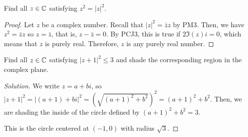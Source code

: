 \question Find all $z\in\mathbb{C}$ satisfying $z^2=|z|^2$.
\begin{proof}
  Let $z$ be a complex number.
  Recall that $|z|^2 = \bar{z}z$ by PM3.
  Then, we have $z^2 = \bar{z}z$ so $z = \bar{z}$, that is, $z - \bar{z} = 0$.
  By PCJ3, this is true if $2\Im(z)i = 0$, which means that $z$ is purely real.
  Therefore, $z$ is any purely real number.
\end{proof}


\question Find all $z\in\mathbb{C}$ satisfying $|z+1|^2 \leq 3$ and shade the corresponding region in the complex plane.
\begin{proof}[Solution]
  We write $z = a+bi$, so $|z+1|^2 = |(a+1)+bi|^2 = (\sqrt{(a+1)^2+b^2})^2 = (a+1)^2 + b^2$.
  Then, we are shading the inside of the circle defined by $(a+1)^2 + b^2 = 3$.
  \begin{center}
  \end{center}
  This is the circle centered at $(-1,0)$ with radius $\sqrt3$.
\end{proof}


